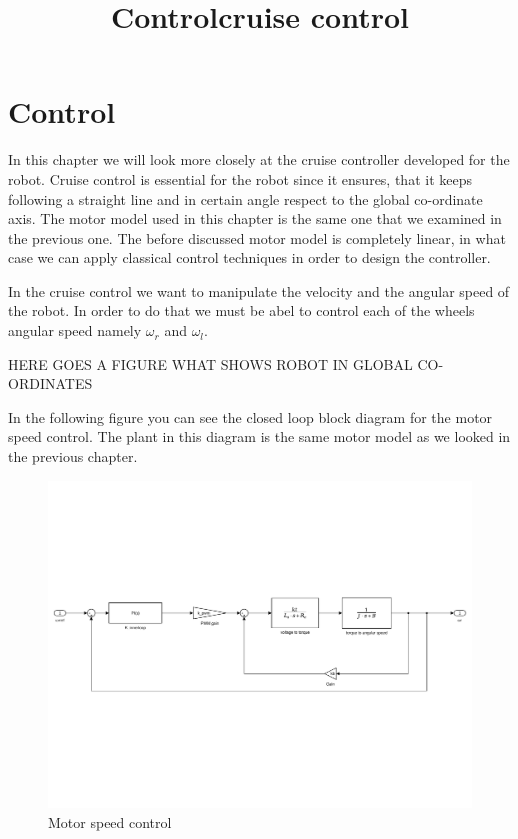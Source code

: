 \chapter{Control}\label{ch:control}




\title{Control}

\title{cruise control}

In this chapter we will look more closely at the cruise controller developed for the robot. Cruise control is essential for the robot since it ensures, that it keeps following a straight line and in certain angle respect to the global co-ordinate axis. The motor model used in this chapter is the same one that we examined in the previous one. The before discussed motor model is completely linear, in what case we can apply classical control techniques in order to design the controller.

In the cruise control we want to manipulate the velocity and the angular speed of the robot. In order to do that we must be abel to control each of the wheels angular speed namely $\omega_{r}$ and $\omega_{l}$.

{\color{red} HERE GOES A FIGURE WHAT SHOWS ROBOT IN GLOBAL CO-ORDINATES}

In the following figure you can see the closed loop block diagram for the motor speed control. The plant in this diagram is the same motor model as we looked in the previous chapter.

\begin{figure}[H]

	
	\centering
 	\includegraphics[width=1\textwidth]{figures/motorspeedcontrolclosedloop.pdf}
	
	
	\caption{Motor speed control} 
 	\label{fig:speedcontrol} 
\end{figure}

